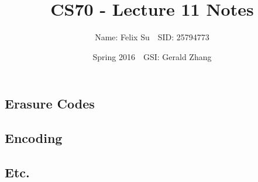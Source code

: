 \documentclass{article}\usepackage{amsmath,amssymb,amsthm,tikz,tkz-graph,color,chngpage,soul,hyperref,csquotes,graphicx,floatrow}\newcommand*{\QEDB}{\hfill\ensuremath{\square}}\newtheorem*{prop}{Proposition}\renewcommand{\theenumi}{\alph{enumi}}\usepackage[shortlabels]{enumitem}\usepackage[nobreak=true]{mdframed}\usetikzlibrary{matrix,calc}\MakeOuterQuote{"}\usepackage[margin=0.75in]{geometry} \newtheorem{theorem}{Theorem}
\title{CS70 - Lecture 11 Notes}
\author{Name: Felix Su$\quad$SID: 25794773}
\date{Spring 2016$\quad$GSI: Gerald Zhang}
\begin{document}
\maketitle

\subsection*{Erasure Codes}
\subsection*{Encoding}
\subsection*{Etc.}
\end{document}
